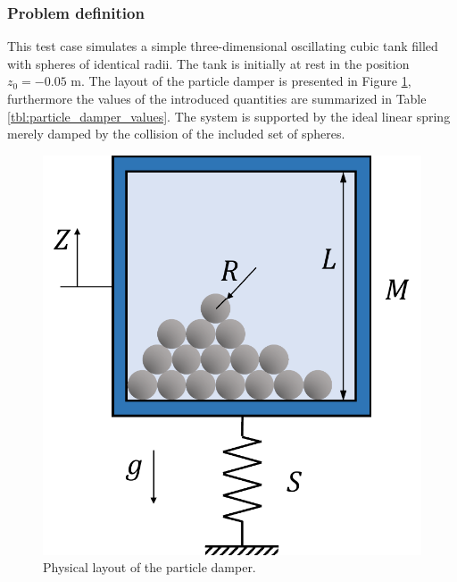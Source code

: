 \documentclass[a4paper,12pt,openany]{book}
\theoremstyle{break}
\begin{document}
\subsubsection{Problem definition}
This test case simulates a simple three-dimensional oscillating cubic tank filled with spheres of identical radii. The tank is initially at rest in the position $z_0=-0.05$ m. The layout of the particle damper is presented in Figure \ref{fig:particle_damper_geom}, furthermore the values of the introduced quantities are summarized in Table \ref{tbl:particle_damper_values}. The system is supported by the ideal linear spring merely damped by the collision of the included set of spheres.
\begin{figure}[H]
  \includegraphics[scale=0.4]{particle_damper_geom.pdf}
  \centering
  \caption{Physical layout of the particle damper.}
  \label{fig:particle_damper_geom}
\end{figure}\vspace*{3pt}
\end{document}
